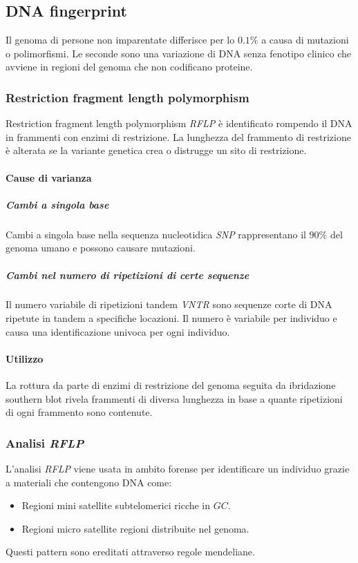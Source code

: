 	\subsection{DNA fingerprint}
	Il genoma di persone non imparentate differisce per lo $0.1\%$ a causa di mutazioni o polimorfismi.
	Le seconde sono una variazione di DNA senza fenotipo clinico che avviene in regioni del genoma che non codificano proteine.
	
		\subsubsection{Restriction fragment length polymorphism}
		Restriction fragment length polymorphism \emph{RFLP} \`e identificato rompendo il DNA in frammenti con enzimi di restrizione.
		La lunghezza del frammento di restrizione \`e alterata se la variante genetica crea o distrugge un sito di restrizione.

			\paragraph{Cause di varianza}

				\subparagraph{Cambi a singola base}
				Cambi a singola base nella sequenza nucleotidica \emph{SNP} rappresentano il $90\%$ del genoma umano e possono causare mutazioni.

				\subparagraph{Cambi nel numero di ripetizioni di certe sequenze}
				Il numero variabile di ripetizioni tandem \emph{VNTR} sono sequenze corte di DNA ripetute in tandem a specifiche locazioni.
				Il numero \`e variabile per individuo e causa una identificazione univoca per ogni individuo.

			\paragraph{Utilizzo}
			La rottura da parte di enzimi di restrizione del genoma seguita da ibridazione southern blot rivela frammenti di diversa lunghezza in base a quante ripetizioni di ogni frammento sono contenute.

		\subsubsection{Analisi \emph{RFLP}}
		L'analisi \emph{RFLP} viene usata in ambito forense per identificare un individuo grazie a materiali che contengono DNA come:
		\begin{multicols}{2}
			\begin{itemize}
				\item Regioni mini satellite subtelomerici ricche in $GC$.
				\item Regioni micro satellite regioni distribuite nel genoma.
			\end{itemize}
		\end{multicols}
		Questi pattern sono ereditati attraverso regole mendeliane.


